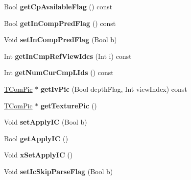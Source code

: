 \begin{DoxyCompactItemize}
\item 
\mbox{\label{class_t_com_slice_ad130bcc625bc1fa72a0e6fc7557172cc}} 
Bool {\bfseries get\+Cp\+Available\+Flag} () const
\item 
\mbox{\label{class_t_com_slice_a682026411538b82394a27567fff98b1c}} 
Bool {\bfseries get\+In\+Comp\+Pred\+Flag} () const
\item 
\mbox{\label{class_t_com_slice_a62ff65ecfbe80de316e64fb556f7d975}} 
Void {\bfseries set\+In\+Comp\+Pred\+Flag} (Bool b)
\item 
\mbox{\label{class_t_com_slice_a37691df740cc474ec54f88a39b423b4e}} 
Int {\bfseries get\+In\+Cmp\+Ref\+View\+Idcs} (Int i) const
\item 
\mbox{\label{class_t_com_slice_aaf15030fd5f539986f4f799edfe5fd89}} 
Int {\bfseries get\+Num\+Cur\+Cmp\+L\+Ids} () const
\item 
\mbox{\label{class_t_com_slice_a301d36d22b5f5bbfb970a8f319a9e325}} 
\hyperlink{class_t_com_pic}{T\+Com\+Pic} $\ast$ {\bfseries get\+Iv\+Pic} (Bool depth\+Flag, Int view\+Index) const
\item 
\mbox{\label{class_t_com_slice_a6cb4eb28000376ea35851393d1343de1}} 
\hyperlink{class_t_com_pic}{T\+Com\+Pic} $\ast$ {\bfseries get\+Texture\+Pic} ()
\item 
\mbox{\label{class_t_com_slice_a506d043418e30eb28bff81b28d0526f2}} 
Void {\bfseries set\+Apply\+IC} (Bool b)
\item 
\mbox{\label{class_t_com_slice_a92d5e8ef40787983f6b070f9d16faae7}} 
Bool {\bfseries get\+Apply\+IC} ()
\item 
\mbox{\label{class_t_com_slice_af37d1f5f1c024ff6c8d8427d789d6a86}} 
Void {\bfseries x\+Set\+Apply\+IC} ()
\item 
\mbox{\label{class_t_com_slice_ad78f4abc7650efd274c616f04267d3ff}} 
Void {\bfseries set\+Ic\+Skip\+Parse\+Flag} (Bool b)

\end{DoxyCompactItemize}
